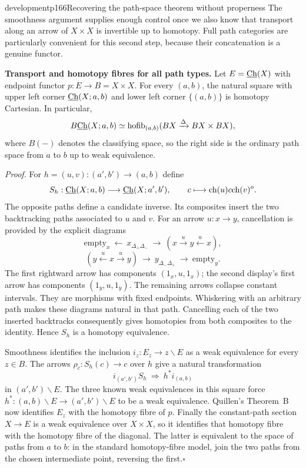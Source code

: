 \begin{dcomment}{development}{p166}{Recovering the path-space theorem without properness}
The smoothness argument supplies enough control once we also know that transport along an arrow of $X\times X$ is invertible up to homotopy. Full path categories are particularly convenient for this second step, because their concatenation is a genuine functor.

\textbf{Transport and homotopy fibres for all path types.}\ours\quad
Let $E=\underline{\mathrm{Ch}}(X)$ with endpoint functor $p:E\to B=X\times X$. For every $(a,b)$, the natural square with upper left corner $\underline{\mathrm{Ch}}(X;a,b)$ and lower left corner $\{(a,b)\}$ is homotopy Cartesian. In particular,
\[
 B\underline{\mathrm{Ch}}(X;a,b)\simeq
 \operatorname{hofib}_{(a,b)}(BX\xrightarrow{\Delta}BX\times BX),
\]
where $B(-)$ denotes the classifying space, so the right side is the ordinary path space from $a$ to $b$ up to weak equivalence.

\emph{Proof.} For $h=(u,v):(a',b')\to(a,b)$ define
\[
 S_h:\underline{\mathrm{Ch}}(X;a,b)\longrightarrow\underline{\mathrm{Ch}}(X;a',b'),
 \qquad c\longmapsto\mathrm{ch}(u)c\mathrm{ch}(v)^o.
\]
The opposite paths define a candidate inverse. Its composites insert the two backtracking paths associated to $u$ and $v$. For an arrow $u:x\to y$, cancellation is provided by the explicit diagrams
\[
 \text{empty}_x\ \longleftarrow\ x_{\Delta_+\Delta_-}
 \ \longrightarrow\ (x\xrightarrow{u}y\xleftarrow{u}x),
\]
\[
 (y\xleftarrow{u}x\xrightarrow{u}y)
 \ \longrightarrow\ y_{\Delta_-\Delta_+}
 \ \longrightarrow\ \text{empty}_y.
\]
The first rightward arrow has components $(1_x,u,1_x)$; the second display's first arrow has components $(1_y,u,1_y)$. The remaining arrows collapse constant intervals. They are morphisms with fixed endpoints. Whiskering with an arbitrary path makes these diagrams natural in that path. Cancelling each of the two inserted backtracks consequently gives homotopies from both composites to the identity. Hence $S_h$ is a homotopy equivalence.

Smoothness identifies the inclusion $i_z:E_z\to z\backslash E$ as a weak equivalence for every $z\in B$. The arrows $\rho_c:S_h(c)\to c$ over $h$ give a natural transformation
\[
 i_{(a',b')}S_h\ \Longrightarrow\ h^*i_{(a,b)}
\]
in $(a',b')\backslash E$. The three known weak equivalences in this square force $h^*:(a,b)\backslash E\to(a',b')\backslash E$ to be a weak equivalence. Quillen's Theorem~B now identifies $E_z$ with the homotopy fibre of $p$. Finally the constant-path section $X\to E$ is a weak equivalence over $X\times X$, so it identifies that homotopy fibre with the homotopy fibre of the diagonal. The latter is equivalent to the space of paths from $a$ to $b$: in the standard homotopy-fibre model, join the two paths from the chosen intermediate point, reversing the first.\hfill$\square$


\end{dcomment}
